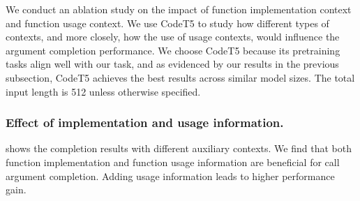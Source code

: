 We conduct an ablation study on the impact of function implementation context and function usage context. We use CodeT5 to study how different types of contexts, and more closely, how the use of usage contexts, would influence the argument completion performance. 
We choose CodeT5 because its pretraining tasks align well with our task, and as evidenced by our results in the previous subsection,  %
CodeT5 achieves the best results across similar model sizes.
The total input length is 512 unless otherwise specified.

\subsubsection{Effect of implementation and usage information.}





\begin{table}[ht]
\centering
\ifaaai
{}
\caption{Performance of CodeT5-base with different auxiliary contexts. }
\label{tab:fc_result}
\fi
\end{table}

 shows the completion results with different auxiliary contexts. We find that both function implementation and function usage information are beneficial for call argument completion. Adding usage information leads to higher performance gain. 

